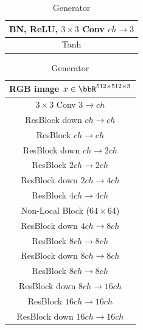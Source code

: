 \begin{table}[ht]
\begin{subtable}{.4\textwidth}
{\begin{tabular}{c}
                  BN, ReLU, $3\times 3$ Conv $ch\rightarrow 3$ \\
                  \midrule
                  Tanh\\
                  \midrule
                  \bottomrule
              \end{tabular}}
              \caption{\label{tab:deep_gen_resnet_imagenet_512} Generator}
          \end{subtable}
          \begin{subtable}{.4\textwidth}
              \centering
              {\begin{tabular}{c}
                  \toprule
                  \midrule
                  RGB image $x\in \bbR^{512 \times 512 \times 3}$ \\
                  \midrule
                  $3\times 3$ Conv $3\rightarrow ch$\\
                  \midrule
                  ResBlock down $ch \rightarrow ch$\\
                  \midrule
                  ResBlock $ch \rightarrow ch$\\
                  \midrule
                  ResBlock down $ch \rightarrow 2ch$\\
                  \midrule
                  ResBlock $2ch \rightarrow 2ch$\\
                  \midrule
                  ResBlock down $2ch \rightarrow 4ch$\\
                  \midrule
                  ResBlock $4ch \rightarrow 4ch$\\
                  \midrule
                  Non-Local Block ($64\times 64$) \\
                  \midrule
                  ResBlock down $4ch \rightarrow 8ch$\\
                  \midrule
                  ResBlock $8ch \rightarrow 8ch$\\
                  \midrule
                  ResBlock down $8ch \rightarrow 8ch$\\
                  \midrule
                  ResBlock $8ch \rightarrow 8ch$\\
                  \midrule
                  ResBlock down $8ch \rightarrow 16ch$\\
                  \midrule
                  ResBlock $16ch \rightarrow 16ch$\\
                  \midrule
                  ResBlock down $16ch \rightarrow 16ch$\\

\end{tabular}}
\end{subtable}
\end{table}
